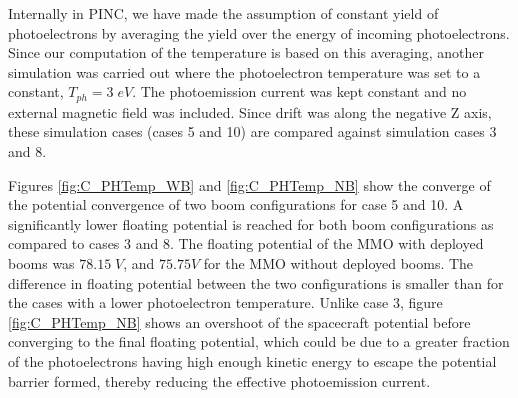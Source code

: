 Internally in PINC, we have made the assumption of constant yield of photoelectrons by averaging the yield over the energy of incoming photoelectrons. Since our computation of the temperature is based on this averaging, another simulation was carried out where the photoelectron temperature was set to a constant, $T_{ph} = 3 \; eV$. The photoemission current was kept constant and no external magnetic field was included. Since drift was along the negative Z axis, these simulation cases (cases 5 and 10) are compared against simulation cases 3 and 8.  

Figures \ref{fig:C_PHTemp_WB} and \ref{fig:C_PHTemp_NB} show the converge of the potential convergence of two boom configurations for case 5 and 10. A significantly lower floating potential is reached for both boom configurations as compared to cases 3 and 8. The floating potential of the MMO with deployed booms was $78.15 \; V$, and $75.75 V$ for the MMO without deployed booms. The difference in floating potential between the two configurations is smaller than for the cases with a lower photoelectron temperature. Unlike case 3, figure \ref{fig:C_PHTemp_NB} shows an overshoot of the spacecraft potential before converging to the final floating potential, which could be due to a greater fraction of the photoelectrons having high enough kinetic energy to escape the potential barrier formed, thereby reducing the effective photoemission current. 

